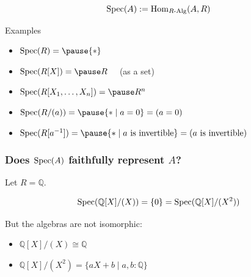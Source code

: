 \documentclass[aspectratio=1610]{beamer}
\begin{document}

\begin{frame}
  \[ \operatorname{Spec}(A) := \mathrm{Hom}_{R\text{-}\mathrm{Alg}}(A, R) \]

  \bigskip
  \begin{exampleblock}{Examples}
    \begin{itemize}
      \item
        $\Spec(R) = \pause \{*\}$
      \pause\item
        $\Spec(R[X]) = \pause R \quad$ (as a set)
      \pause\item
        $\Spec(R[X_1, \dots, X_n]) = \pause R^n$
      \pause\item
        $\Spec(R/(a)) = \pause \{* \mid a = 0\} = (a = 0)$
      \pause\item
        $\Spec(R[a^{-1}]) = \pause \{* \mid \text{$a$ is invertible}\} = (\text{$a$ is invertible})$
    \end{itemize}
  \end{exampleblock}
\end{frame}

\begin{frame}
  \frametitle{Does $\operatorname{Spec}(A)$ faithfully represent $A$?}
  Let $R = \mathbb{Q}$.

  \[ \operatorname{Spec}(\mathbb{Q}[X]/(X)) = \{0\} = \operatorname{Spec}(\mathbb{Q}[X]/(X^2))\]

  \bigskip
  But the algebras are not isomorphic:
  \begin{itemize}
    \item
      $\mathbb{Q}[X]/(X) \cong \mathbb{Q}$
    \item
      $\mathbb{Q}[X]/(X^2) = \{ aX + b \mid a, b : \mathbb{Q}\}$
  \end{itemize}
\end{frame}
\end{document}
